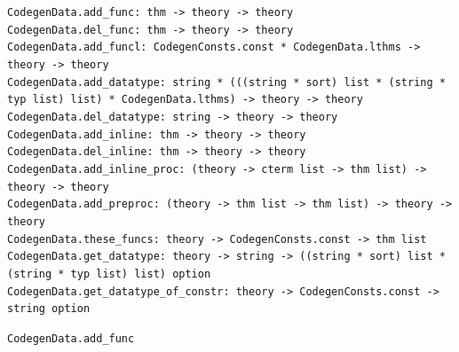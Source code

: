 \begin{isabellebody}
\isadelimmlref
%
\endisadelimmlref
%
\isamarkuptrue%
%
\isadelimmlref
%
\endisadelimmlref
%
\isatagmlref
%
\begin{isamarkuptext}%
\begin{mldecls}
  \verb|CodegenData.add_func: thm -> theory -> theory| \\
  \verb|CodegenData.del_func: thm -> theory -> theory| \\
  \verb|CodegenData.add_funcl: CodegenConsts.const * CodegenData.lthms -> theory -> theory| \\
  \verb|CodegenData.add_datatype: string * (((string * sort) list * (string * typ list) list) * CodegenData.lthms) -> theory -> theory| \\
  \verb|CodegenData.del_datatype: string -> theory -> theory| \\
  \verb|CodegenData.add_inline: thm -> theory -> theory| \\
  \verb|CodegenData.del_inline: thm -> theory -> theory| \\
  \verb|CodegenData.add_inline_proc: (theory -> cterm list -> thm list) -> theory -> theory| \\
  \verb|CodegenData.add_preproc: (theory -> thm list -> thm list) -> theory -> theory| \\
  \verb|CodegenData.these_funcs: theory -> CodegenConsts.const -> thm list| \\
  \verb|CodegenData.get_datatype: theory -> string -> ((string * sort) list * (string * typ list) list) option| \\
  \verb|CodegenData.get_datatype_of_constr: theory -> CodegenConsts.const -> string option|
  \end{mldecls}

  \begin{description}

  \item \verb|CodegenData.add_func|~


\end{description}
\end{isamarkuptext}
\end{isabellebody}
